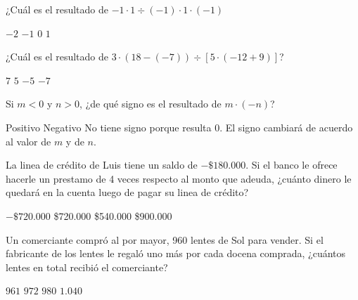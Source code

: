 \documentclass[spanish,letterpaper, 12pt, addpoints, answers]{exam}
\begin{document}
\begin{questions}
    \question[1] ¿Cuál es el resultado de $-1\cdot 1\div (-1)\cdot 1\cdot (-1)$
    \begin{choices}
        \choice $-2$
        \CorrectChoice $-1$
        \choice $0$
        \choice $1$
    \end{choices}
    \vspace{0.15in}

    \newpage
    \question[1] ¿Cuál es el resultado de $3\cdot (18-(-7))\div \left[5\cdot (-12+9)\right]$?
    \begin{choices}
        \choice $7$
        \choice $5$
        \CorrectChoice $-5$
        \choice $-7$
    \end{choices}
    \vspace{0.15in}

    \question[1] Si $m<0$ y $n>0$, ¿de qué signo es el resultado de $m\cdot (-n)$?
    \begin{choices}
        \CorrectChoice Positivo
        \choice Negativo
        \choice No tiene signo porque resulta 0.
        \choice El signo cambiará de acuerdo al valor de $m$ y de $n$.
    \end{choices}
    \vspace{0.15in}

    \question[1] La linea de crédito de Luis tiene un saldo de $-\$180.000$. Si el banco le ofrece hacerle un prestamo de 4 veces respecto al monto que adeuda, ¿cuánto dinero le quedará en la cuenta luego de pagar su linea de crédito?
    \begin{choices}
        \choice $-\$720.000$
        \choice \$720.000
        \CorrectChoice \$540.000
        \choice \$900.000
    \end{choices}
    \vspace{0.15in}

    \question[1] Un comerciante compró al por mayor, 960 lentes de Sol para vender. Si el fabricante de los lentes le regaló uno más por cada docena comprada, ¿cuántos lentes en total recibió el comerciante?
    \begin{choices}
        \choice $961$
        \choice $972$
        \choice $980$
        \CorrectChoice $1.040$
    \end{choices}
    \vspace{0.15in}




\end{questions}
\end{document}
